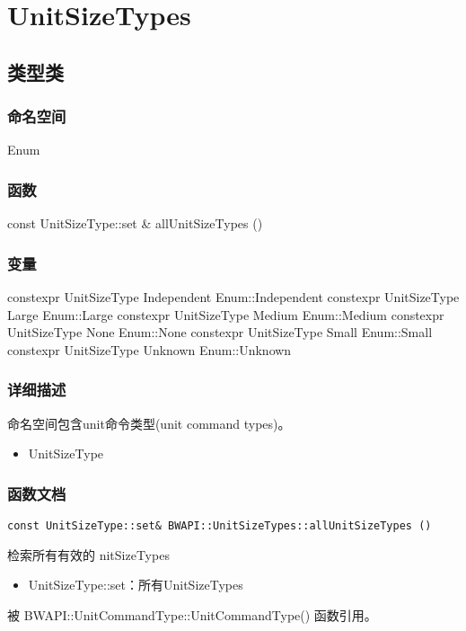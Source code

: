 \tableofcontents
\section{UnitSizeTypes}
\subsection{类型类}
\subsubsection{命名空间}
Enum
\subsubsection{函数}
\begin{codebox}[函数]
const UnitSizeType::set & 	allUnitSizeTypes ()
\end{codebox}
\subsubsection{变量}
\begin{codebox}[变量]
constexpr UnitSizeType Independent {Enum::Independent}
constexpr UnitSizeType Large {Enum::Large}
constexpr UnitSizeType Medium {Enum::Medium}
constexpr UnitSizeType None {Enum::None}
constexpr UnitSizeType Small {Enum::Small}
constexpr UnitSizeType Unknown {Enum::Unknown}
\end{codebox}
\subsubsection{详细描述}
命名空间包含unit命令类型(unit command types)。
\begin{refer}
\begin{itemize}
    \item UnitSizeType
\end{itemize}
\end{refer}

\subsubsection{函数文档}
\begin{tcolorbox}[colback=white, colframe=black!60!white, title=allUnitSizeTypes(), arc=0mm]
\begin{verbatim}
const UnitSizeType::set& BWAPI::UnitSizeTypes::allUnitSizeTypes ()
\end{verbatim}
检索所有有效的 nitSizeTypes
\begin{return}
\begin{itemize}
    \item UnitSizeType::set：所有UnitSizeTypes
\end{itemize}
\end{return}
被 BWAPI::UnitCommandType::UnitCommandType()   函数引用。
\end{tcolorbox}

